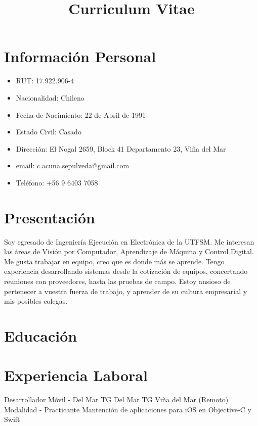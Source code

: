 \documentclass[10pt,letterpaper,sans]{moderncv}
\title{Curriculum Vitae}
\begin{document}
\makecvtitle

\section{Información Personal}
\label{sec:orgfa4e788}
\begin{itemize}
\item RUT: 17.922.906-4
\item Nacionalidad: Chileno
\item Fecha de Nacimiento: 22 de Abril de 1991
\item Estado Civil: Casado
\item Dirección: El Nogal 2659, Block 41 Departamento 23, Viña del Mar
\item email: c.acuna.sepulveda@gmail.com
\item Teléfono: +56 9 6403 7058
\end{itemize}
\section{Presentación}
\label{sec:org93c8601}
  Soy egresado de Ingeniería Ejecución en Electrónica de la UTFSM. Me interesan
las áreas de Visión por Computador, Aprendizaje de Máquina y Control Digital.
Me gusta trabajar en equipo, creo que es donde más se aprende. Tengo experiencia
desarrollando sistemas desde la cotización de equipos, concertando reuniones con
proveedores, hasta las pruebas de campo. Estoy ansioso de pertenecer a vuestra
fuerza de trabajo, y aprender de su cultura empresarial y mis posibles colegas. 
\section{Educación}
\label{sec:org0bb4669}
\section{Experiencia Laboral}
\label{sec:org6f89432}
{Desarrollador Móvil - Del Mar TG}
{Del Mar TG}
{Viña del Mar (Remoto)}
{Modalidad - Practicante}
{Mantención de aplicaciones para iOS en Objective-C y Swift}
\end{document}
